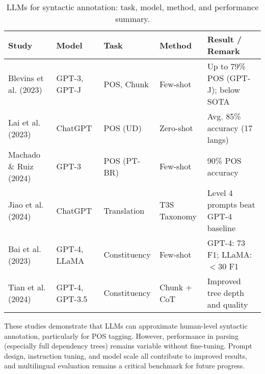 \begin{table}[ht]
\centering
\begin{tabular}{p{3.3cm} p{2cm} p{2cm} p{2.5cm} p{3.5cm}}
\toprule
\textbf{Study} & \textbf{Model} & \textbf{Task} & \textbf{Method} & \textbf{Result / Remark} \\
\midrule
Blevins et al. (2023) & GPT-3, GPT-J & POS, Chunk & Few-shot & Up to 79\% POS (GPT-J); below SOTA \\
Lai et al. (2023) & ChatGPT & POS (UD) & Zero-shot & Avg. 85\% accuracy (17 langs) \\
Machado \& Ruiz (2024) & GPT-3 & POS (PT-BR) & Few-shot & 90\% POS accuracy \\
Jiao et al. (2024) & ChatGPT & Translation & T3S Taxonomy & Level 4 prompts beat GPT-4 baseline \\
Bai et al. (2023) & GPT-4, LLaMA & Constituency & Few-shot & GPT-4: 73 F1; LLaMA: $<$30 F1 \\
Tian et al. (2024) & GPT-4, GPT-3.5 & Constituency & Chunk + CoT & Improved tree depth and quality \\
\bottomrule
\end{tabular}
\caption{LLMs for syntactic annotation: task, model, method, and performance summary.}
\label{tab:llm_syntax}
\end{table}

These studies demonstrate that LLMs can approximate human-level syntactic annotation, particularly for POS tagging. However, performance in parsing (especially full dependency trees) remains variable without fine-tuning. Prompt design, instruction tuning, and model scale all contribute to improved results, and multilingual evaluation remains a critical benchmark for future progress.



